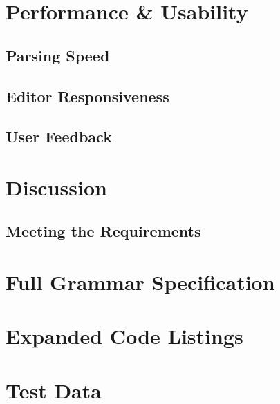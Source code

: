 \documentclass[11pt]{report}
\begin{document}
\chapter{Performance \& Usability}
\section{Parsing Speed}
\section{Editor Responsiveness}
\section{User Feedback}

\chapter{Discussion}
\section{Meeting the Requirements}

\printbibliography

\appendix

\chapter{Full Grammar Specification}

\chapter{Expanded Code Listings}

\chapter{Test Data}
\end{document}
